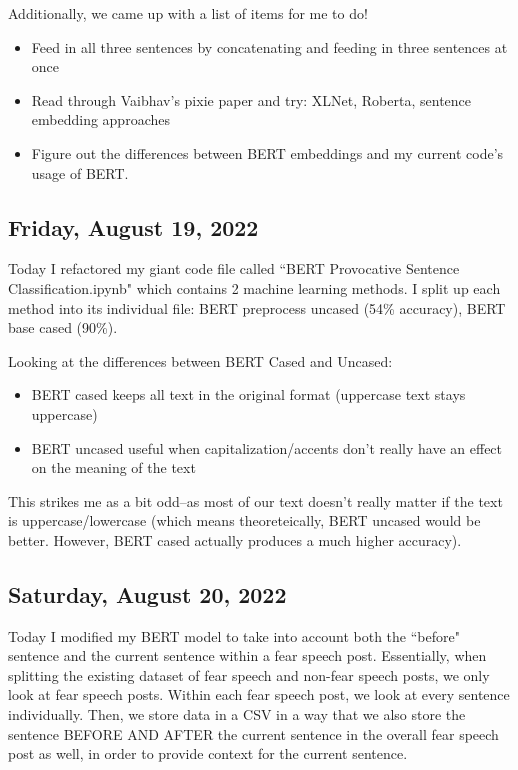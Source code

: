 \documentclass[11pt,letterpaper]{article}
\begin{document}
Additionally, we came up with a list of items for me to do!

\begin{itemize}
    \item Feed in all three sentences by concatenating and feeding in three sentences at once

    \item Read through Vaibhav's pixie paper and try: XLNet, Roberta, sentence embedding approaches
    \item Figure out the differences between BERT embeddings and my current code's usage of BERT.
\end{itemize}


\subsection{Friday, August 19, 2022}
Today I refactored my giant code file called ``BERT Provocative Sentence Classification.ipynb" which contains 2 machine learning methods. I split up each method into its individual file: BERT preprocess uncased (54\% accuracy), BERT base cased (90\%).

Looking at the differences between BERT Cased and Uncased:
\begin{itemize}
    \item BERT cased keeps all text in the original format (uppercase text stays uppercase)
    \item BERT uncased useful when capitalization/accents don't really have an effect on the meaning of the text
\end{itemize}

This strikes me as a bit odd--as most of our text doesn't really matter if the text is uppercase/lowercase (which means theoreteically, BERT uncased would be better. However, BERT cased actually produces a much higher accuracy).

\subsection{Saturday, August 20, 2022}
Today I modified my BERT model to take into account both the ``before" sentence and the current sentence within a fear speech post. Essentially, when splitting the existing dataset of fear speech and non-fear speech posts, we only look at fear speech posts. Within each fear speech post, we look at every sentence individually. Then, we store data in a CSV in a way that we also store the sentence BEFORE AND AFTER the current sentence in the overall fear speech post as well, in order to provide context for the current sentence.
\end{document}
